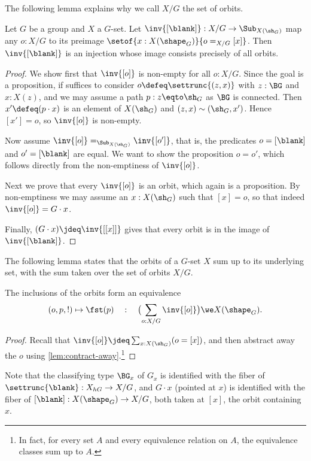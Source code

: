 The following lemma explains why we call $X/G$ the set of orbits.
\begin{lemma}\label{lem:G/X-set-of-orbits}
Let $G$ be a group and $X$ a $G$-set. 
Let $\inv{[\blank]} : X/G \to \Sub_{X(\sh_G)}$
map any $o:X/G$ to its preimage $\setof{x : X(\shape_G)}{o =_{X/G} [x]}$.
Then $\inv{[\blank]}$ is an injection whose
image consists precisely of all orbits.
\end{lemma}
\begin{proof}
We show first that $\inv{[o]}$ is non-empty for all $o:X/G$.
Since the goal is a proposition, if suffices to consider
$o\defeq\settrunc{(z,x)}$ with $z:\BG$ and $x:X(z)$,
and we may assume a path $p:z\eqto\sh_G$ as $\BG$ is connected.
Then $x'\defeq (p\cdot x)$ is an element of $X(\sh_G)$ and
$(z,x)\sim(\sh_G,x')$. Hence $[x'] = o$, so $\inv{[o]}$ is non-empty.

Now assume $\inv{[o]}=_{\Sub_{X(\sh_G)}}\inv{[o']}$, that is,
the predicates $o=[\blank]$ and $o'=[\blank]$ are equal.
We want to show the proposition $o=o'$, which follows directly
from the non-emptiness of $\inv{[o]}$.

Next we prove that every $\inv{[o]}$ is an orbit, which again
is a proposition. By non-emptiness we may assume an $x:X(\sh_G)$ 
such that $[x] = o$, so that indeed $\inv{[o]} = G\cdot x$.

Finally, $(G\cdot x)\jdeq \inv{[[x]]}$ gives that every orbit is 
in the image of $\inv{[\blank]}$.
\end{proof}

The following lemma states that the orbits of a $G$-set $X$
sum up to its underlying set, with the sum taken over the set
of orbits $X/G$.

\begin{lemma}
  \label{lem:splitting into orbits}
  The inclusions of the orbits form an equivalence
\[
  (o,p,!)\mapsto\fst(p) \quad:\quad
  \bigl(\sum_{o:X/G} \inv{[o]} \bigr) \we X(\shape_G).
\]
\end{lemma}
\begin{proof}
Recall that $\inv{[o]}\jdeq \sum_{x:X(\sh_G)}(o=[x])$, 
and then abstract
away the $o$ using \cref{lem:contract-away}.\footnote{%
In fact, for every set $A$ and every equivalence relation on $A$,
the equivalence classes sum up to $A$.}
\end{proof}


Note that the classifying type $\BG_x$ of $G_x$
is identified with the fiber of $\settrunc{\blank} : X_{hG} \to X/G$,
and $G\cdot x$ (pointed at $x$)
is identified with the fiber of $[\blank] : X(\shape_G) \to X/G$,
both taken at $[x]$, the orbit containing $x$.

